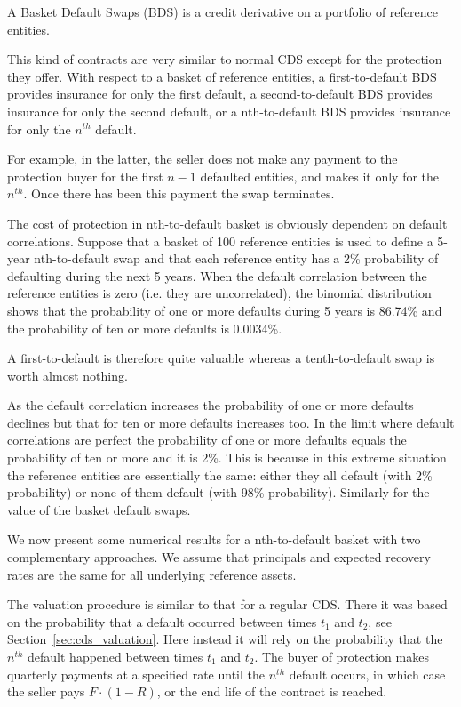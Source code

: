 A Basket Default Swaps (BDS) is a credit derivative on a portfolio of reference entities.

This kind of contracts are very similar to normal CDS except for the protection they offer. With respect to a basket of reference entities, a first-to-default BDS provides insurance for only the first default, a second-to-default BDS provides insurance for only the second default, or a nth-to-default BDS provides insurance for only the $n^{th}$ default. 

For example, in the latter, the seller does not make any payment to the protection buyer for the first $n-1$ defaulted entities, and makes it only for the $n^{th}$. Once there has been this payment the swap terminates.

The cost of protection in nth-to-default basket is obviously dependent on default correlations. Suppose that a basket of 100 reference entities is used to define a 5-year nth-to-default swap and that each reference entity has a 2\% probability of defaulting during the next 5 years. When the default correlation between the reference entities is zero (i.e. they are uncorrelated), the binomial distribution shows that the probability of one or more defaults during 5 years is 86.74\% and the probability of ten or more defaults is 0.0034\%.

A first-to-default is therefore quite valuable whereas a tenth-to-default swap is worth almost nothing.

As the default correlation increases the probability of one or more defaults declines but that for ten or more defaults increases too. In the limit where default correlations are perfect the probability of one or more defaults equals the probability of ten or more and it is 2\%. This is because in this extreme situation the reference entities are essentially the same: either they all default (with 2\% probability) or none of them default (with 98\% probability). Similarly for the value of the basket default swaps.

We now present some numerical results for a nth-to-default basket with two complementary approaches. We assume that principals and expected recovery rates are the same for all underlying reference assets. 

The valuation procedure is similar to that for a regular CDS. There it was based on the probability that a default occurred between times $t_1$ and $t_2$, see Section~\ref{sec:cds_valuation}. Here instead it will rely on the probability that the $n^{th}$ default happened between times $t_1$ and $t_2$. The buyer of protection makes quarterly payments at a specified rate until the $n^{th}$ default occurs, in which case the seller pays $F\cdot(1-R)$, or the end life of the contract is reached. 

